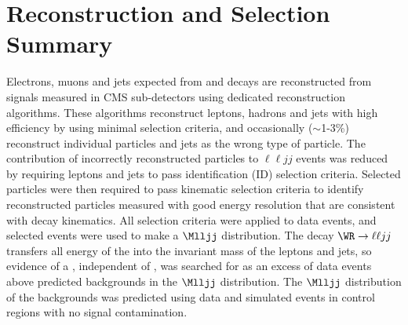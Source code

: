 \section{Reconstruction and Selection Summary}
\label{sec:recoConclusion}
Electrons, muons and jets expected from \WR and \nul decays are reconstructed from signals measured in CMS sub-detectors using dedicated 
reconstruction algorithms.  These algorithms reconstruct leptons, hadrons and jets with high efficiency by using minimal selection criteria, 
and occasionally ($\sim$1-3\%) reconstruct individual particles and jets as the wrong type of particle.  The contribution of incorrectly 
reconstructed particles to $\ell\ell jj$ events was reduced by requiring leptons and jets to pass identification (ID) selection criteria.  
Selected particles were then required to pass kinematic selection criteria to identify reconstructed particles measured with good energy 
resolution that are consistent with \WR decay kinematics.  All selection criteria were applied to data events, and selected events were 
used to make a $\Mlljj$ distribution.  The decay $\WR \rightarrow \ell\ell jj$ transfers all energy of the \WR into the invariant mass of 
the leptons and jets, so evidence of a \WR, independent of \mnul, was searched for as an excess of data events above predicted backgrounds 
in the $\Mlljj$ distribution.  The $\Mlljj$ distribution of the backgrounds was predicted using data and simulated events in control regions 
with no signal contamination.


